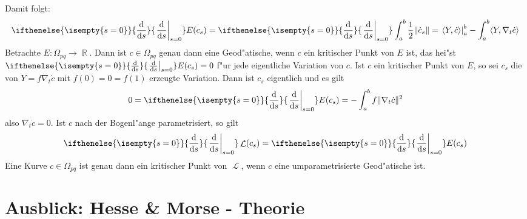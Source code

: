 \documentclass[paper=A4, twoside, chapterprefix=true, bibliography=totoc, headsepline]{scrbook}
\DeclareMathOperator{\R}{\mathbb{R}}
\DeclareMathOperator{\calL}{\mathcal{L}}
\newcommand{\dop}{\mathrm{d}}
\newcommand{\difffrac}[3][]{\ifthenelse{\isempty{#1}}{\frac{\dop #2}{\dop #3}}{\left. \frac{\dop #2}{\dop #3} \right|_{#1}}}
\theoremstyle{plain}
\theoremstyle{nonumberplain}
\theoremstyle{empty}
\theoremstyle{break}
\begin{document}
Damit folgt:
\begin{align*}
  \difffrac[s=0]{}{s} E(c_s) = \difffrac[s=0]{}{s} \int_a^b
  \frac{1}{2} \|\dot c_s\| = \left. \langle Y, \dot c \rangle
  \right|_a^b - \int_a^b \langle Y, \nabla_t \dot c \rangle
\end{align*}
Betrachte $E: \Omega_{pq} \to \R$. Dann ist $c \in \Omega_{pq}$ genau dann eine Geod"atische, wenn $c$ ein kritischer Punkt von $E$ ist, das hei"st $\difffrac[s=0]{}{s}E(c_s) = 0$ f"ur jede eigentliche Variation von $c$.
Ist $c$ ein kritischer Punkt von $E$, so sei $c_s$ die von $Y = f \nabla_t \dot c$ mit $f(0) = 0 = f(1)$ erzeugte Variation.
Dann ist $c_s$ eigentlich und es gilt
\begin{align*}
  0 = \difffrac[s=0]{}{s} E(c_s) = - \int_a^b f \|\nabla_t \dot c\|^2
\end{align*}
also $\nabla_t \dot c = 0$.  Ist $c$ nach der Bogenl"ange
parametrisiert, so gilt
\begin{align*}
  \difffrac[s=0]{}{s} \calL(c_s) = \difffrac[s=0]{}{s} E(c_s)
\end{align*}
Eine Kurve $c \in \Omega_{pq}$ ist genau dann ein kritischer Punkt von $\calL$, wenn $c$ eine umparametrisierte Geod"atische ist.

\section{Ausblick: Hesse \& Morse - Theorie}
\end{document}
